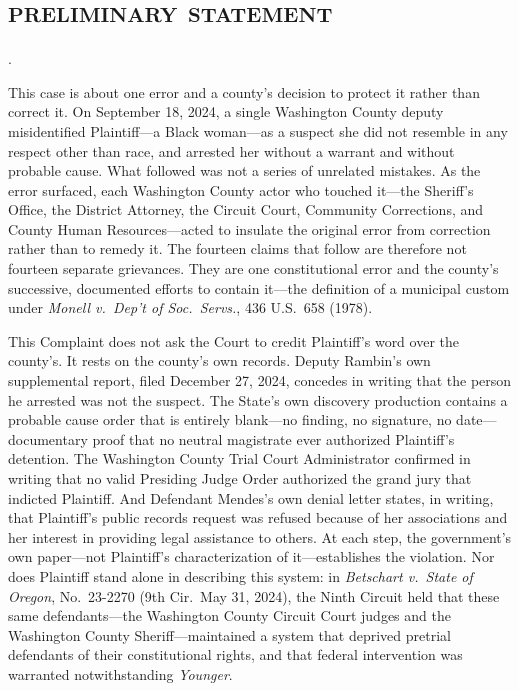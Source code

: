 \documentclass[12pt,letterpaper]{article}
\newcounter{complaintpara}
\newenvironment{paras}{%
	\begin{list}{\arabic{complaintpara}.}{%
			\setlength{\leftmargin}{0.5in}%
			\setlength{\labelwidth}{0.4in}%
			\setlength{\labelsep}{0.1in}%
			\setlength{\itemsep}{0pt}%
			\setlength{\parsep}{0pt}%
			\setlength{\topsep}{6pt}%
		}%
	}{%
	\end{list}%
}
\begin{document}
	\doublespacing
	
	\section*{\textsc{preliminary statement}}
	
	\begin{paras}
		
		\item This case is about one error and a county's decision to protect it rather than correct it. On September 18, 2024, a single Washington County deputy misidentified Plaintiff---a Black woman---as a suspect she did not resemble in any respect other than race, and arrested her without a warrant and without probable cause. What followed was not a series of unrelated mistakes. As the error surfaced, each Washington County actor who touched it---the Sheriff's Office, the District Attorney, the Circuit Court, Community Corrections, and County Human Resources---acted to insulate the original error from correction rather than to remedy it. The fourteen claims that follow are therefore not fourteen separate grievances. They are one constitutional error and the county's successive, documented efforts to contain it---the definition of a municipal custom under \textit{Monell v.\ Dep't of Soc.\ Servs.}, 436 U.S.\ 658 (1978).
		
		\item This Complaint does not ask the Court to credit Plaintiff's word over the county's. It rests on the county's own records. Deputy Rambin's own supplemental report, filed December 27, 2024, concedes in writing that the person he arrested was not the suspect. The State's own discovery production contains a probable cause order that is entirely blank---no finding, no signature, no date---documentary proof that no neutral magistrate ever authorized Plaintiff's detention. The Washington County Trial Court Administrator confirmed in writing that no valid Presiding Judge Order authorized the grand jury that indicted Plaintiff. And Defendant Mendes's own denial letter states, in writing, that Plaintiff's public records request was refused because of her associations and her interest in providing legal assistance to others. At each step, the government's own paper---not Plaintiff's characterization of it---establishes the violation. Nor does Plaintiff stand alone in describing this system: in \textit{Betschart v.\ State of Oregon}, No.\ 23-2270 (9th Cir.\ May 31, 2024), the Ninth Circuit held that these same defendants---the Washington County Circuit Court judges and the Washington County Sheriff---maintained a system that deprived pretrial defendants of their constitutional rights, and that federal intervention was warranted notwithstanding \textit{Younger}.
		

\end{paras}
\end{document}
